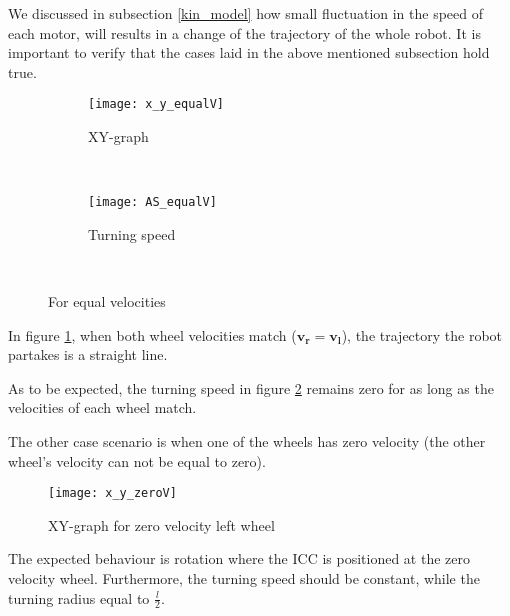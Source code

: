 We discussed in subsection \ref{kin_model} how small fluctuation in the speed of each motor, will results in a change of the trajectory of the whole robot. It is important to verify that the cases laid in the above mentioned subsection hold true.

\begin{figure}[h]
    \centering
    \begin{subfigure}[h]{0.47\textwidth}
        \texttt{[image: x\_y\_equalV]}
        \caption{XY-graph}
        \label{fig:v_l=v_r}
    \end{subfigure}
    ~ %
    \begin{subfigure}[h]{0.47\textwidth}
        \texttt{[image: AS\_equalV]}
        \caption{Turning speed}
        \label{fig:Wv_l=v_r}
    \end{subfigure}
    ~ %
    \caption{For equal velocities}\label{fig:eqV}
\end{figure}

In figure \ref{fig:v_l=v_r}, when both wheel velocities match ($\boldsymbol{v_r = v_l}$), the trajectory the robot partakes is a straight line. 

As to be expected, the turning speed in figure \ref{fig:Wv_l=v_r} remains zero for as long as the velocities of each wheel match.

\newpage

The other case scenario is when one of the wheels has zero velocity (the other wheel's velocity can not be equal to zero).

\begin{figure}[h]
\centering
\texttt{[image: x\_y\_zeroV]}
\caption{XY-graph for zero velocity left wheel}
\label{fig::ZeroV}
\end{figure} 

The expected behaviour is rotation where the ICC is positioned at the zero velocity wheel. Furthermore, the turning speed should be constant, while the turning radius equal to $\frac{l}{2}$.

